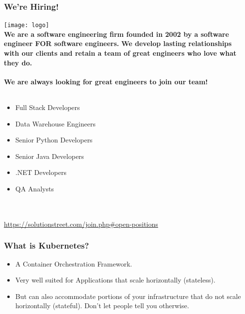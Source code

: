     \begin{frame}
        \frametitle{We're Hiring!}
        \begin{center}
            \texttt{[image: logo]}\\
            \textbf{We are a software engineering firm founded in 2002 by a software engineer FOR software engineers.}
            \textbf{We develop lasting relationships with our clients and retain a team of great engineers who love what they do.}\\~\\
            \textbf{We are always looking for great engineers to join our team!}\\~\\
            \begin{minipage}{0.45\textwidth}
                \begin{itemize}
                    \item{Full Stack Developers}
                    \item{Data Warehouse Engineers}
                    \item{Senior Python Developers}
                    \item{Senior Java Developers}
                    \item{.NET Developers}
                    \item{QA Analysts}
                \end{itemize}
            \end{minipage}
            \\~\\
            \href{https://solutionstreet.com/join.php}{https://solutionstreet.com/join.php\#open-positions}
        \end{center}

    \end{frame}

    \begin{frame}
        \frametitle{What is Kubernetes?}
        \begin{itemize}
            \item{A Container Orchestration Framework.}\pause
            \item{Very well suited for Applications that scale horizontally (stateless).}\pause
            \item{But can also accommodate portions of your infrastructure that do not scale horizontally (stateful). Don't let people tell you otherwise.}
        \end{itemize}
    \end{frame}

